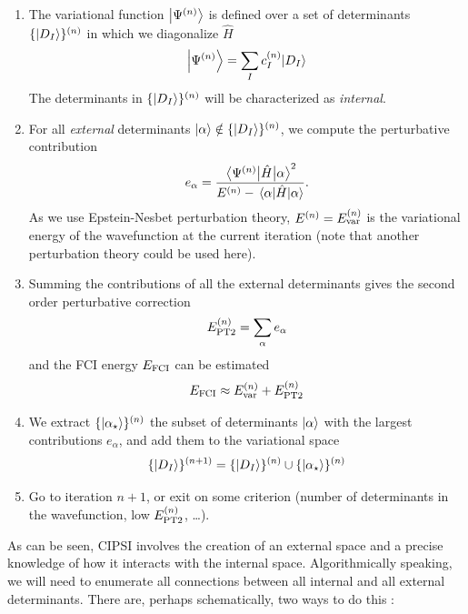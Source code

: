 \documentclass[./thesis.tex]{subfiles}
\begin{document}
\begin{enumerate}
\item

The variational function $\ket {\Psi^{(n)}}$ is defined over a set of determinants $\{\ket{D_I}\}^{(n)}$ in which we diagonalize $\widehat{H}$
\begin{equation}
\ket{\Psi^{(n)}} = \sum_{I} c_I^{(n)} {\ket{D_I}}
\end{equation}
The determinants in $\{\ket{D_I}\}^{(n)}$ will be characterized as \emph{internal}.

\item
For all \emph{external} determinants ${\ket{\alpha}} \notin \{\ket{D_I}\}^{(n)}$, we compute the perturbative contribution
\begin{equation}
e_\alpha = \frac{\mel{\Psi^{(n)}}{\hat{H}}{\alpha}^2}{E^{(n)} - \mel{\alpha}{\hat{H}}{\alpha}}.
\end{equation}
As we use Epstein-Nesbet perturbation theory, $E^{(n)}=E_\text{var}^{(n)}$ is the variational energy of the wavefunction at the current iteration (note that another perturbation theory could be used here).

\item Summing the contributions of all the external determinants gives the second order perturbative correction
\begin{equation}
E_\text{PT2}^{(n)} = \sum_{\alpha} e_\alpha
\end{equation}
and the FCI energy $E_\text{FCI}$ can be estimated
\begin{equation}
E_\text{FCI} \approx E_\text{var}^{(n)} + E_\text{PT2}^{(n)}
\end{equation}

\item
We extract $\{ \ket{\alpha_\star} \}^{(n)}$ the subset of determinants ${\ket{\alpha}}$ with the largest contributions $e_\alpha$, and add them to the variational space
\begin{equation}
\{\ket{D_I}\}^{(n+1)} = \{\ket{D_I}\}^{(n)} \cup \{ \ket {\alpha_\star} \}^{(n)}
\end{equation}

\item
Go to iteration $n+1$, or exit on some criterion (number of determinants in the wavefunction, low $E_\text{PT2}^{(n)}$, \dots).

\end{enumerate}



As can be seen, CIPSI involves the creation of an external space and a precise knowledge of how it interacts with the internal space. Algorithmically speaking, we will need to enumerate all connections between all internal and all external determinants.
There are, perhaps schematically, two ways to do this :
\end{document}
